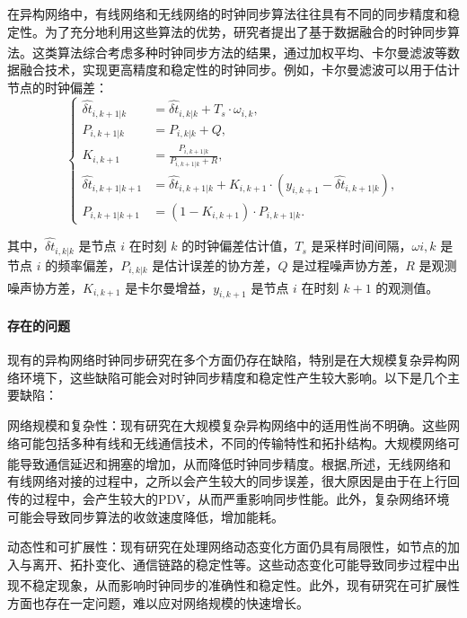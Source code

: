\documentclass[UTF8,a4paper,12pt]{ctexart}
\numberwithin{equation}{section}
\begin{document}
	在异构网络中，有线网络和无线网络的时钟同步算法往往具有不同的同步精度和稳定性。为了充分地利用这些算法的优势，研究者提出了基于数据融合的时钟同步算法\textsuperscript{\cite{anees2020hesitant}}。这类算法综合考虑多种时钟同步方法的结果，通过加权平均、卡尔曼滤波等数据融合技术，实现更高精度和稳定性的时钟同步。例如，卡尔曼滤波可以用于估计节点的时钟偏差：
	\begin{equation}
		\left\{
		\begin{aligned}
			\hat{\delta t}_{i,k+1|k} &= \hat{\delta t}_{i,k|k} + T_s \cdot \omega_{i,k},\\
			P_{i,k+1|k} &= P_{i,k|k} + Q,\\
			K_{i,k+1} &= \frac{P_{i,k+1|k}}{P_{i,k+1|k} + R},\\
			\hat{\delta t}_{i,k+1|k+1} &= \hat{\delta t}_{i,k+1|k} + K_{i,k+1} \cdot (y_{i,k+1} - \hat{\delta t}_{i,k+1|k}),\\
			P_{i,k+1|k+1} &= (1 - K_{i,k+1}) \cdot P_{i,k+1|k}.
		\end{aligned}
		\right.
	\end{equation}
	
	其中，$\hat{\delta t}_{i,k|k}$ 是节点 $i$ 在时刻 $k$ 的时钟偏差估计值，$T_s$ 是采样时间间隔，$\omega{i,k}$ 是节点 $i$ 的频率偏差，$P_{i,k|k}$ 是估计误差的协方差，$Q$ 是过程噪声协方差，$R$ 是观测噪声协方差，$K_{i,k+1}$ 是卡尔曼增益，$y_{i,k+1}$ 是节点 $i$ 在时刻 $k+1$ 的观测值\textsuperscript{\cite{grewal2020kalman}}。
	
	
	\paragraph{存在的问题}现有的异构网络时钟同步研究在多个方面仍存在缺陷，特别是在大规模复杂异构网络环境下，这些缺陷可能会对时钟同步精度和稳定性产生较大影响。以下是几个主要缺陷：
	
	网络规模和复杂性：现有研究在大规模复杂异构网络中的适用性尚不明确。这些网络可能包括多种有线和无线通信技术，不同的传输特性和拓扑结构。大规模网络可能导致通信延迟和拥塞的增加，从而降低时钟同步精度\textsuperscript{\cite{rinaldi2016time}}。根据\cite{chaloupka2014clock},\cite{johannessen2004time}所述，无线网络和有线网络对接的过程中，之所以会产生较大的同步误差，很大原因是由于在上行回传的过程中，会产生较大的PDV，从而严重影响同步性能。此外，复杂网络环境可能会导致同步算法的收敛速度降低，增加能耗。
	
	动态性和可扩展性：现有研究在处理网络动态变化方面仍具有局限性，如节点的加入与离开、拓扑变化、通信链路的稳定性等。这些动态变化可能导致同步过程中出现不稳定现象，从而影响时钟同步的准确性和稳定性\textsuperscript{\cite{qiu2017heterogeneous}}。此外，现有研究在可扩展性方面也存在一定问题，难以应对网络规模的快速增长。
	
\end{document}
